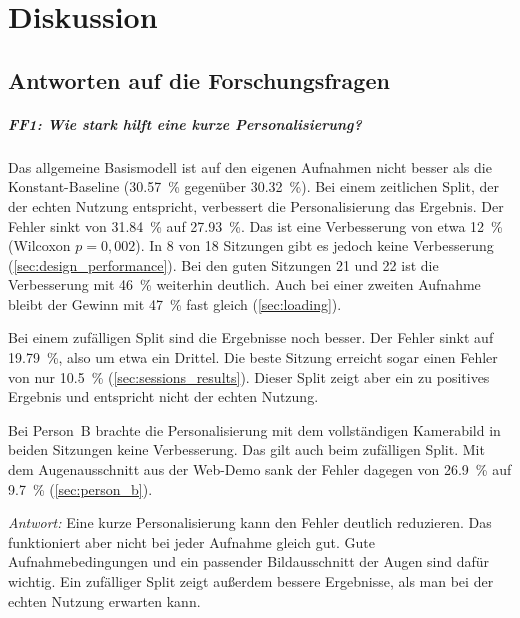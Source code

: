 \chapter{Diskussion}
\label{ch:diskussion}

\section{Antworten auf die Forschungsfragen}
\label{sec:antworten}

\paragraph{FF1: Wie stark hilft eine kurze Personalisierung?}
Das allgemeine Basismodell ist auf den eigenen Aufnahmen nicht besser als die
Konstant-Baseline (\SI{30,57}{\percent} gegenüber \SI{30,32}{\percent}). Bei
einem zeitlichen Split, der der echten Nutzung entspricht, verbessert die
Personalisierung das Ergebnis. Der Fehler sinkt von \SI{31,84}{\percent} auf
\SI{27,93}{\percent}. Das ist eine Verbesserung von etwa \SI{12}{\percent}
(Wilcoxon $p=0,002$). In 8 von 18 Sitzungen gibt es jedoch keine Verbesserung
(\cref{sec:design_performance}). Bei den guten Sitzungen 21 und 22 ist die
Verbesserung mit \SI{46}{\percent} weiterhin deutlich. Auch bei einer zweiten
Aufnahme bleibt der Gewinn mit \SI{47}{\percent} fast gleich
(\cref{sec:loading}).

Bei einem zufälligen Split sind die Ergebnisse noch besser. Der Fehler sinkt auf
\SI{19,79}{\percent}, also um etwa ein Drittel. Die beste Sitzung erreicht sogar
einen Fehler von nur \SI{10,5}{\percent} (\cref{sec:sessions_results}). Dieser
Split zeigt aber ein zu positives Ergebnis und entspricht nicht der echten
Nutzung.

Bei Person~B brachte die Personalisierung mit dem vollständigen Kamerabild in
beiden Sitzungen keine Verbesserung. Das gilt auch beim zufälligen Split. Mit
dem Augenausschnitt aus der Web-Demo sank der Fehler dagegen von
\SI{26,9}{\percent} auf \SI{9,7}{\percent} (\cref{sec:person_b}).

\emph{Antwort:} Eine kurze Personalisierung kann den Fehler deutlich
reduzieren. Das funktioniert aber nicht bei jeder Aufnahme gleich gut. Gute
Aufnahmebedingungen und ein passender Bildausschnitt der Augen sind dafür
wichtig. Ein zufälliger Split zeigt außerdem bessere Ergebnisse, als man bei der
echten Nutzung erwarten kann.

